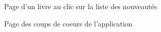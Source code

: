 \documentclass[a4paper, 12pt]{article}
\begin{document}
\begin{figure}
    \begin{center}
    \end{center}
    \caption{Page d'un livre au clic sur la liste des nouveautés}
\end{figure}
\begin{figure}
    \begin{center}
    \end{center}
    \caption{Page des coups de coeurs de l'application}
\end{figure}
\end{document}
